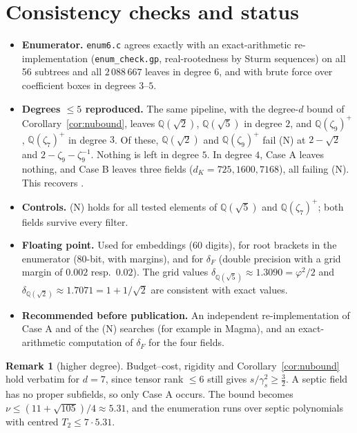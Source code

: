 \documentclass[11pt]{amsart}
\theoremstyle{definition}
\newtheorem{remark}[theorem]{Remark}
\newcommand{\Q}{\mathbb{Q}}
\newcommand{\file}[1]{\texttt{#1}}
\begin{document}
\section{Consistency checks and status}\label{sec:status}

\begin{itemize}[leftmargin=*]
\item \textbf{Enumerator.}  \file{enum6.c} agrees exactly with an exact-arithmetic
  re-implementation (\file{enum\_check.gp}, real-rootedness by Sturm sequences) on all 56
  subtrees and all $2\,088\,667$ leaves in degree $6$, and with brute force over coefficient
  boxes in degrees $3$--$5$.
\item \textbf{Degrees $\le5$ reproduced.}  The same pipeline, with the degree-$d$ bound of
  Corollary~\ref{cor:nubound}, leaves $\Q(\sqrt2)$, $\Q(\sqrt5)$ in degree $2$, and
  $\Q(\zeta_9)^+$, $\Q(\zeta_7)^+$ in degree $3$.  Of these, $\Q(\sqrt2)$ and
  $\Q(\zeta_9)^+$ fail (N) at $2-\sqrt2$ and $2-\zeta_9-\zeta_9^{-1}$.  Nothing is left in
  degree $5$.  In degree $4$, Case A leaves nothing, and Case B leaves three fields
  ($d_K=725,1600,7168$), all failing (N).  This recovers \cite[Thm.~1.2]{KY-EB}.
\item \textbf{Controls.}  (N) holds for all tested elements of $\Q(\sqrt5)$ and
  $\Q(\zeta_7)^+$; both fields survive every filter.
\item \textbf{Floating point.}  Used for embeddings (60 digits), for root brackets in the
  enumerator (80-bit, with margins), and for $\delta_F$ (double precision with a grid margin
  of $0.002$ resp.\ $0.02$).  The grid values $\delta_{\Q(\sqrt5)}\approx1.3090=\varphi^2/2$ and
  $\delta_{\Q(\sqrt2)}\approx1.7071=1+1/\sqrt2$ are consistent with exact values.
\item \textbf{Recommended before publication.}  An independent re-implementation of Case A
  and of the (N) searches (for example in Magma), and an exact-arithmetic computation of
  $\delta_F$ for the four fields.
\end{itemize}

\begin{remark}[higher degree]
Budget--cost, rigidity and Corollary~\ref{cor:nubound} hold verbatim for $d=7$, since tensor
rank $\le6$ still gives $s/\gamma_s^2\ge\frac32$.  A septic field has no proper subfields,
so only Case A occurs.  The bound becomes $\nu\le(11+\sqrt{105})/4\approx5.31$, and the
enumeration runs over septic polynomials with centred $T_2\le 7\cdot5.31$.
\end{remark}
\end{document}

